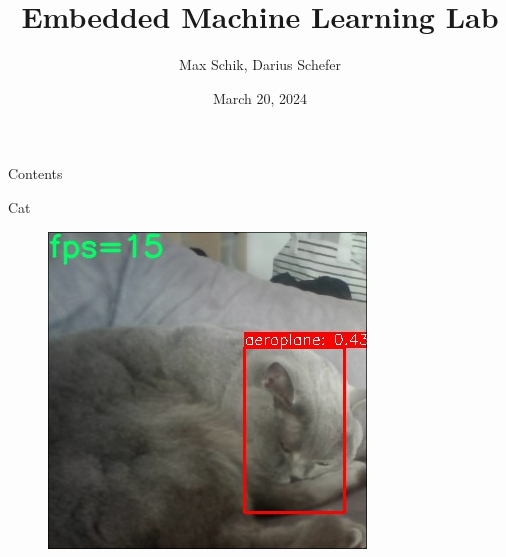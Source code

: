 \documentclass[en]{sdqbeamer}
\title[EML-lab]{Embedded Machine Learning Lab}
\author[Max Schik, Darius Schefer]{Max Schik, Darius Schefer}
\date[03/20/2024]{March 20, 2024}
\begin{document}
\KITtitleframe

\begin{frame}{Contents}
  \tableofcontents
\end{frame}

\begin{frame}{Cat}
  \begin{figure}
    \includegraphics[scale=0.55]{kira_detection}
  \end{figure}
\end{frame}
\end{document}
